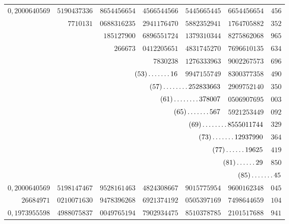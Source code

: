 \begin{longtable}{@{}rrrrrrr@{}}
\hline
$0{,}2000640569$ & $5190437336$ & $8654456654$ & $4566544566$ & $5445665445$ & $6654456654$ & $456$\\
 & $7710131$ & $0688316235$ & $2941176470$ & $5882352941$ & $1764705882$ & $352$\\
 &  & $185127900$ & $6896551724$ & $1379310344$ & $8275862068$ & $965$\\
 &  & $266673$ & $0412205651$ & $4831745270$ & $7696610135$ & $634$\\
 &  &  & $7830238$ & $1276333963$ & $9002267573$ & $696$\\
 &  & \multicolumn{2}{r}{$(53)\mathinner{.\,.\,.\,.\,.\,.\,.}16$} & $9947155749$ & $8300377358$ & $490$\\
 &  &  & \multicolumn{2}{r}{$(57)\mathinner{.\,.\,.\,.\,.\,.\,.\,.}252833663$} & $2909752140$ & $350$\\
 &  &  & \multicolumn{2}{r}{$(61)\mathinner{.\,.\,.\,.\,.\,.\,.\,.}378007$} & $0506907695$ & $003$\\
 &  &  & \multicolumn{2}{r}{$(65)\mathinner{.\,.\,.\,.\,.\,.\,.}567$} & $5921253449$ & $092$\\
 &  &  &  & \multicolumn{2}{r}{$(69)\mathinner{.\,.\,.\,.\,.\,.\,.\,.}8555011744$} & $329$\\
 &  &  &  & \multicolumn{2}{r}{$(73)\mathinner{.\,.\,.\,.\,.\,.\,.}12937990$} & $364$\\
 &  &  &  & \multicolumn{2}{r}{$(77)\mathinner{.\,.\,.\,.\,.\,.}19625$} & $419$\\
 &  &  &  & \multicolumn{2}{r}{$(81)\mathinner{.\,.\,.\,.\,.\,.}29$} & $850$\\
 &  &  &  &  & \multicolumn{2}{r}{$(85)\mathinner{.\,.\,.\,.\,.\,.\,.}45$}\\
\hline
$0{,}2000640569$ & $5198147467$ & $9528161463$ & $4824308667$ & $9015775954$ & $9600162348$ & $045$\\
$26684971$ & $0210071630$ & $9478396268$ & $6921374192$ & $0505397169$ & $7498644659$ & $104$\\
\hline
$0{,}1973955598$ & $4988075837$ & $0049765194$ & $7902934475$ & $8510378785$ & $2101517688$ & $941$\\
\end{longtable}\endgroup
